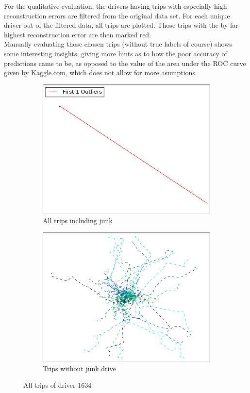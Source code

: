 \documentclass{vldb}
\begin{document}
For the qualitative evaluation, the drivers having trips with especially high reconstruction errors are filtered from the original data set. For each unique driver out of the filtered data, all trips are plotted. Those trips with the by far highest reconstruction error are then marked red. \\
Manually evaluating those chosen trips (without true labels of course) shows some interesting insights, giving more hints as to how the poor accuracy of predictions came to be, as opposed to the value of the area under the ROC curve given by Kaggle.com, which does not allow for more asumptions.
\begin{figure}
\begin{subfigure}{\linewidth}
	\centering
	\includegraphics[width=.8\linewidth]{"pics/outliers_junk/D_1634_with_136"}
	\caption{All trips including junk}
	\label{subfig:d-1634-junk}
\end{subfigure}
\begin{subfigure}{\linewidth}
  \centering
  \includegraphics[width=0.8\linewidth]{"pics/outliers_junk/D_1634_wo_136"}
\caption{Trips without junk drive}
\label{subfig:d-1634}
\end{subfigure}
\caption{All trips of driver 1634}
\label{fig:d-1634}
\end{figure}
\end{document}
